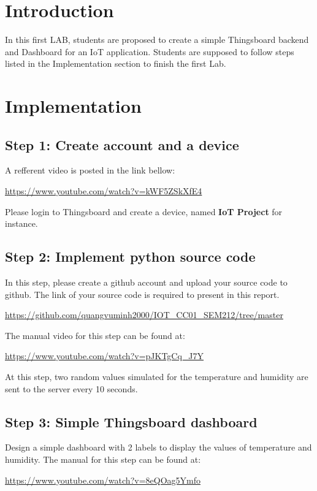 \documentclass[a4paper,11pt]{article}
\theoremstyle{mytheor}
\begin{document}
\renewcommand{\contentsname}{Content}
\newpage
\vspace{1cm}
\tableofcontents
\newpage

\section{Introduction}
In this first LAB, students are proposed to create a simple Thingsboard backend and Dashboard for an IoT application. Students are supposed to follow steps listed in the Implementation section to finish the first Lab.

\section{Implementation}

\subsection{Step 1: Create account and a device}
A refferent video is posted in the link bellow:
\begin{center}
    \url{https://www.youtube.com/watch?v=kWF5ZSkXfE4}
\end{center}

Please login to Thingsboard and create a device, named \textbf{IoT Project} for instance. 


\subsection{Step 2: Implement python source code}
In this step, please create a github account and upload your source code to github. The link of your source code is required to present in this report.

\begin{center}
    \url{https://github.com/quangvuminh2000/IOT_CC01_SEM212/tree/master}
\end{center}

The manual video for this step can be found at:
\begin{center}
    \url{https://www.youtube.com/watch?v=pJKTgCq\_J7Y}
\end{center}

At this step, two random values simulated for the temperature and humidity are sent to the server every 10 seconds.

\subsection{Step 3: Simple Thingsboard dashboard}
Design a simple dashboard with 2 labels to display the values of temperature and humidity. The manual for this step can be found at:
\begin{center}
    \url{https://www.youtube.com/watch?v=8eQOag5Ymfo}
\end{center}
\end{document}
